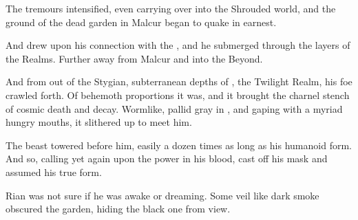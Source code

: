 \begin{garbage}

The tremours intensified, even carrying over into the Shrouded world, and the ground of the dead garden in Malcur began to quake in earnest. 


And \Ishnaruchaefir{} drew upon his connection with the \xzaishanns{}, and he submerged through the layers of the Realms. Further away from Malcur and into the Beyond. 

\index{\Nyx}
And from out of the Stygian, subterranean depths of \Nyx, the Twilight Realm, his foe crawled forth. 
Of behemoth proportions it was, and it brought the charnel stench of cosmic death and decay. 
Wormlike, pallid gray in \colour, and gaping with a myriad hungry mouths, it slithered up to meet him. 

\index{\ghobal}%

The beast towered before him, easily a dozen times as long as his humanoid form. 
And so, calling yet again upon the \xzaishannic{} power in his blood, \Ishnaruchaefir{} cast off his mask and assumed his true form. 









\begin{comment}
\subsection{Battle beyond the Shroud}
\end{comment}

\begin{comment}
\subsubsection{Rian}
\end{comment}
\new
Rian was not sure if he was awake or dreaming. 
Some veil like dark smoke obscured the garden, hiding the black one from view. %


\end{garbage}
